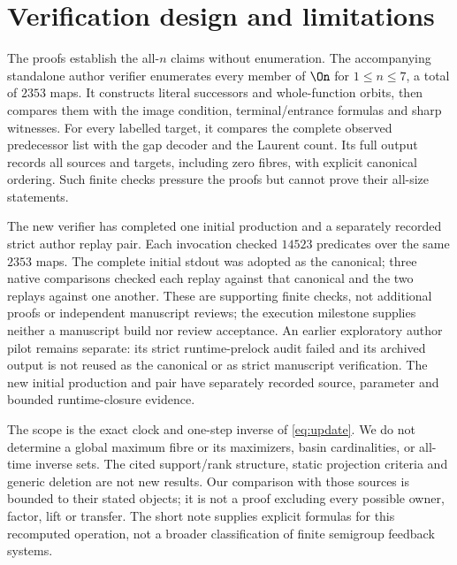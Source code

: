 \section{Verification design and limitations}

The proofs establish the all-$n$ claims without enumeration. The
accompanying standalone author verifier enumerates every
member of $\On$ for $1\le n\le7$, a total of $2353$ maps. It constructs
literal successors and whole-function orbits, then compares them with
the image condition, terminal/entrance formulas and sharp witnesses.
For every labelled target, it compares the complete observed predecessor
list with the gap decoder and the Laurent count. Its full output records
all sources and targets, including zero fibres, with explicit canonical
ordering. Such finite checks pressure the proofs but cannot prove their
all-size statements.

The new verifier has completed one initial production and a separately
recorded strict author replay pair. Each invocation checked $14523$
predicates over the same $2353$ maps. The complete initial stdout was
adopted as the canonical; three native comparisons checked each replay
against that canonical and the two replays against one another. These
are supporting finite checks, not additional proofs or independent
manuscript reviews; the execution milestone supplies neither a manuscript
build nor review acceptance. An earlier exploratory author pilot remains
separate: its strict runtime-prelock audit failed and its archived output
is not reused as the canonical or as strict manuscript verification.
The new initial production and pair have separately recorded source,
parameter and bounded runtime-closure evidence.

The scope is the exact clock and one-step inverse of
\eqref{eq:update}. We do not determine a global maximum fibre or its
maximizers, basin cardinalities, or all-time inverse sets. The cited
support/rank structure, static projection criteria and generic deletion
are not new results. Our comparison with those sources is bounded to
their stated objects; it is not a proof excluding every possible owner,
factor, lift or transfer. The short note supplies explicit formulas for
this recomputed operation, not a broader classification of finite
semigroup feedback systems.

